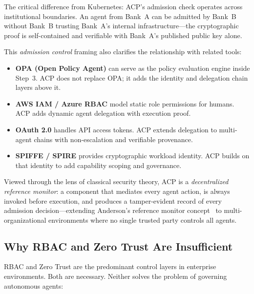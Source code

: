 \documentclass[11pt]{article}
\theoremstyle{definition}
\begin{document}
The critical difference from Kubernetes: ACP's admission check operates across institutional boundaries.
An agent from Bank~A can be admitted by Bank~B without Bank~B trusting Bank~A's internal infrastructure---the
cryptographic proof is self-contained and verifiable with Bank~A's published public key alone.

This \emph{admission control} framing also clarifies the relationship with related tools:
\begin{itemize}[noitemsep]
  \item \textbf{OPA (Open Policy Agent)} \cite{opa} can serve as the policy evaluation engine inside Step~3.
        ACP does not replace OPA; it adds the identity and delegation chain layers above it.
  \item \textbf{AWS IAM / Azure RBAC} model static role permissions for humans.
        ACP adds dynamic agent delegation with execution proof.
  \item \textbf{OAuth 2.0} \cite{rfc6749} handles API access tokens.
        ACP extends delegation to multi-agent chains with non-escalation and verifiable provenance.
  \item \textbf{SPIFFE / SPIRE} \cite{spiffe} provides cryptographic workload identity.
        ACP builds on that identity to add capability scoping and governance.
\end{itemize}

\noindent Viewed through the lens of classical security theory, ACP is a
\emph{decentralized reference monitor}: a component that mediates every agent
action, is always invoked before execution, and produces a tamper-evident record
of every admission decision---extending Anderson's reference monitor concept~\cite{anderson1972planning}
to multi-organizational environments where no single trusted party controls all agents.

\subsection{Why RBAC and Zero Trust Are Insufficient}

RBAC and Zero Trust are the predominant control layers in enterprise environments.
Both are necessary. Neither solves the problem of governing autonomous agents:
\end{document}
